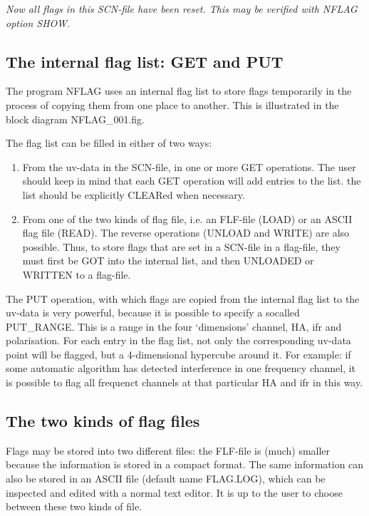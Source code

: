 {\it Now all flags in this SCN-file have been reset.
This may be verified with NFLAG option SHOW.}



\newpage
\subsection{The internal flag list: GET and PUT}
\label{.list}

The program NFLAG uses an internal flag list to store flags temporarily
in the process of copying them from one place to another. This is
illustrated in the block diagram NFLAG\_001.fig.


The flag list can be filled in either of two ways:

\begin{enumerate}
\item
From the uv-data in the SCN-file, in one or more GET operations. The user
should keep in mind that each GET operation will add entries to the list.
the list should be explicitly CLEARed when necessary.
\item
From one of the two kinds of flag file, i.e. an FLF-file (LOAD) or an
ASCII flag file (READ). The reverse operations (UNLOAD and WRITE) are
also possible.
Thus, to store flags that are set in a SCN-file in a flag-file, they must
first be GOT into the internal list, and then UNLOADED or WRITTEN to
a flag-file.
\end{enumerate}

The PUT operation, with which flags are copied from the internal flag list
to the uv-data is very powerful, because it is possible to specify a
socalled PUT\_RANGE. This is a range in the four `dimensions' channel, HA,
ifr and polarisation. For each entry in the flag list, not only the
corresponding uv-data point will be flagged, but a 4-dimensional hypercube
around it. For example: if some automatic algorithm has detected interference
in one frequency channel, it is possible to flag all frequenct channels at
that particular HA and ifr in this way.

\newpage
\subsection{The two kinds of flag files}
\label{.file}

Flags may be stored into two different files: the FLF-file is (much) smaller
because the information is stored in a compact format. The same information
can also be stored in an ASCII file (default name FLAG.LOG), which can be
inspected and edited with a normal text editor. It is up to the user to
choose between these two kinds of file.

